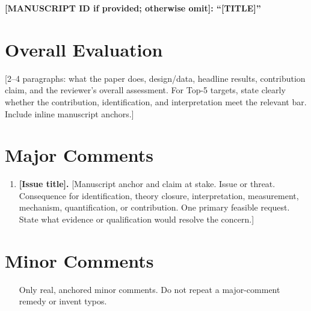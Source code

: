 \documentclass[11pt]{article}
\begin{document}
\begin{center}
{\Large \textbf{[MANUSCRIPT ID if provided; otherwise omit]: ``[TITLE]''}}\\
\vspace{0.25em}
\end{center}

\section*{Overall Evaluation}

[2--4 paragraphs: what the paper does, design/data, headline results, contribution claim, and the reviewer's overall assessment. For Top-5 targets, state clearly whether the contribution, identification, and interpretation meet the relevant bar. Include inline manuscript anchors.]

\section*{Major Comments}

\begin{enumerate}
  \item \textbf{[Issue title].} [Manuscript anchor and claim at stake. Issue or threat. Consequence for identification, theory closure, interpretation, measurement, mechanism, quantification, or contribution. One primary feasible request. State what evidence or qualification would resolve the concern.]
\end{enumerate}

\section*{Minor Comments}

\begin{enumerate}
  \item [Only real, anchored minor comments. Do not repeat a major-comment remedy or invent typos.]
\end{enumerate}
\end{document}

